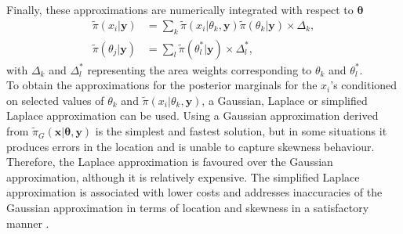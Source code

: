 Finally, these approximations are numerically integrated with respect to $\pmb{\theta}$
\begin{align}
    \widetilde{\pi}\left(x_i|\pmb{y}\right)&=\sum_k\widetilde{\pi}\left(x_i|\theta_k,\pmb{y}\right)\widetilde{\pi}\left(\theta_k|\pmb{y}\right)\times\Delta_k,\\
    \widetilde{\pi}\left(\theta_j|\pmb{y}\right)&=\sum_l\widetilde{\pi}\left(\theta_l^*|\pmb{y}\right)\times\Delta_l^*,
\end{align}
with $\Delta_k$ and $\Delta_l^*$ representing the area weights corresponding to $\theta_k$ and $\theta_l^*$. \\
To obtain the approximations for the posterior marginals for the $x_i$'s conditioned on selected values of $\theta_k$ and $\widetilde{\pi}\left(x_i|\theta_k,\pmb{y}\right)$, a Gaussian, Laplace or simplified Laplace approximation can be used. Using a Gaussian approximation derived from $\widetilde{\pi}_G\left(\pmb{x}|\pmb{\theta},\pmb{y}\right)$ is the simplest and fastest solution, but in some situations it produces errors in the location and is unable to capture skewness behaviour. Therefore, the Laplace approximation is favoured over the Gaussian approximation, although it is relatively expensive. The simplified Laplace approximation is associated with lower costs and addresses inaccuracies of the Gaussian approximation in terms of location and skewness in a satisfactory manner \autocite[][]{moraga2019geospatial}.
